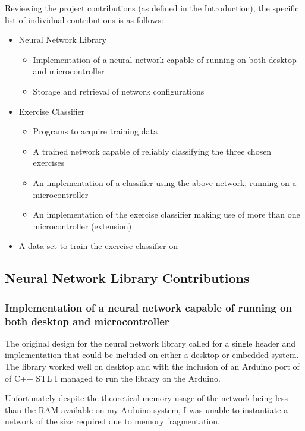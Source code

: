 \documentclass[a4paper]{article}
\begin{document}
Reviewing the project contributions (as defined in the \hyperref[subsec:in_cs]{Introduction}), the specific list of individual contributions is as follows:

\begin{itemize}
\item Neural Network Library 
  \begin{itemize}
  \item Implementation of a neural network capable of running on  both desktop and microcontroller
    \item Storage and retrieval of network configurations
  \end{itemize}
\item Exercise Classifier
  \begin{itemize}
  \item Programs to acquire training data
    \item A trained network capable of reliably classifying the three chosen exercises
    \item An implementation of a classifier using the above network, running on a microcontroller
    \item An implementation of the exercise classifier making use of more than one microcontroller (extension)
  \end{itemize}
\item A data set to train the exercise classifier on
\end{itemize}

\newpage
\subsection{Neural Network Library Contributions}%
\label{subsec:ev_nn}

\subsubsection{Implementation of a neural network capable of running on  both desktop and microcontroller}

The original design for the neural network library called for a single header and implementation that could be included on either a desktop or embedded system. The library worked well on desktop and with the inclusion of an Arduino port of of C++ STL\cite{evref1} I managed to run the library on the Arduino. 

Unfortunately despite the theoretical memory usage of the network being less than the RAM available on my Arduino system, I was unable to instantiate a network of the size required due to memory fragmentation. 
\end{document}
